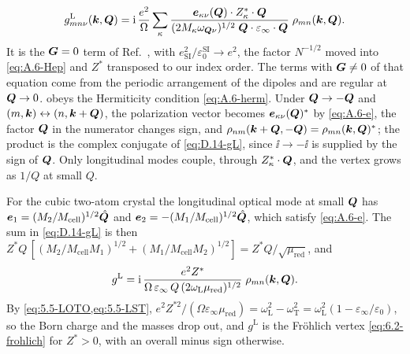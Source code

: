 \begin{equation}
  g^{\mathrm{L}}_{mn\nu}(\bm{k},\bm{Q}) = \mathrm{i}\,\frac{e^2}{\Omega}\sum_\kappa\frac{\bm{e}_{\kappa\nu}(\bm{Q})\cdot Z^*_\kappa\cdot\bm{Q}}{(2M_\kappa\omega_{\bm{Q}\nu})^{1/2}\;\bm{Q}\cdot\varepsilon_\infty\cdot\bm{Q}}\;\rho_{mn}(\bm{k},\bm{Q}) .
  \label{eq:D.14-gL}
\end{equation}
It is the $\bm{G} = 0$ term of Ref.~\cite[Eq.~(4)]{verdi2015frohlich}, with $e^2_{\mathrm{SI}}/\varepsilon_0^{\mathrm{SI}} \to e^2$, the factor $N^{-1/2}$ moved into \cref{eq:A.6-Hep} and $Z^*$ transposed to our index order. The terms with $\bm{G} \ne 0$ of that equation come from the periodic arrangement of the dipoles and are regular at $\bm{Q} \to 0$.  obeys the Hermiticity condition \cref{eq:A.6-herm}. Under $\bm{Q} \to -\bm{Q}$ and $(m,\bm{k}) \leftrightarrow (n,\bm{k}+\bm{Q})$, the polarization vector becomes $\bm{e}_{\kappa\nu}(\bm{Q})^*$ by \cref{eq:A.6-e}, the factor $\bm{Q}$ in the numerator changes sign, and $\rho_{nm}(\bm{k}+\bm{Q},-\bm{Q}) = \rho_{mn}(\bm{k},\bm{Q})^*$; the product is the complex conjugate of \cref{eq:D.14-gL}, since $\ii \to -\ii$ is supplied by the sign of $\bm{Q}$. Only longitudinal modes couple, through $Z^*_\kappa\cdot\bm{Q}$, and the vertex grows as $1/Q$ at small $Q$.

For the cubic two-atom crystal the longitudinal optical mode at small $\bm{Q}$ has $\bm{e}_{1} = (M_2/M_{\mathrm{cell}})^{1/2}\hat{\bm{Q}}$ and $\bm{e}_{2} = -(M_1/M_{\mathrm{cell}})^{1/2}\hat{\bm{Q}}$, which satisfy \cref{eq:A.6-e}. The sum in \cref{eq:D.14-gL} is then $Z^*Q\,[(M_2/M_{\mathrm{cell}}M_1)^{1/2} + (M_1/M_{\mathrm{cell}}M_2)^{1/2}] = Z^*Q/\sqrt{\mu_{\mathrm{red}}}$, and
\begin{equation*}
  g^{\mathrm{L}} = \mathrm{i}\,\frac{e^2Z^*}{\Omega\,\varepsilon_\infty\,Q\,(2\omega_{\mathrm{L}}\mu_{\mathrm{red}})^{1/2}}\;\rho_{mn}(\bm{k},\bm{Q}) .
\end{equation*}
By \cref{eq:5.5-LOTO,eq:5.5-LST}, $e^2Z^{*2}/(\Omega\varepsilon_\infty\mu_{\mathrm{red}}) = \omega_{\mathrm{L}}^2 - \omega_{\mathrm{T}}^2 = \omega_{\mathrm{L}}^2(1 - \varepsilon_\infty/\varepsilon_0)$, so the Born charge and the masses drop out, and $g^{\mathrm{L}}$ is the Fr\"ohlich vertex \cref{eq:6.2-frohlich} for $Z^* > 0$, with an overall minus sign otherwise.
